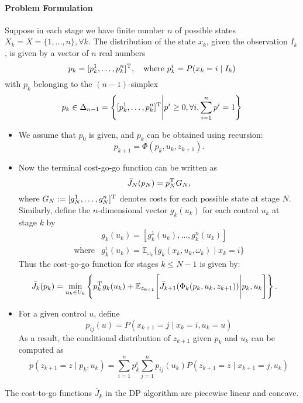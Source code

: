 \paragraph{Problem Formulation}
Suppose in each stage we have finite number $n$ of possible states $X_k=X=\{1,\dots,n\},\forall k$.
The distribution of the state $x_k$, given the observation $I_k$,
is given by a vector of $n$ real numbers 
\[
p_k=[p_k^1,\dots,p_k^n]^{\mathrm T},\quad
\text{where }p_k^i = P(x_k=i\mid I_k)
\]
with $p_k$ belonging to the $(n-1)$-simplex
\[
p_k\in\Delta_{n-1}=\left\{
[p_k^1,\dots,p_k^n]^{\mathrm T}\middle|p^i\ge0,\forall i,
\sum_{i=1}^np^i=1
\right\}
\]
\begin{itemize}
\item
We assume that $p_0$ is given, and $p_k$ can be obtained using recursion:
\[
p_{k+1}=\Phi(p_k,u_k,z_{k+1}).
\]
\item
Now the terminal cost-go-go function can be written as
\[
\bar{J}_N(p_N)=p_N^{\mathrm T} G_N,
\]
where $G_N:=[g_{N}^1,\dots,g_N^n]^{\mathrm T}$ denotes costs for each possible state at stage $N$.
Similarly, define the $n$-dimensional vector $g_k(u_k)$
for each control $u_k$ at stage $k$ by
\[
\begin{array}{ll}
&g_k(u_k)=[g_k^1(u_k),\dots,g_k^n(u_k)]\\
\text{where}&g_k^i(u_k)=\mathbb{E}_{\omega_k}\{g_k(x_k,u_k,\omega_k)\mid x_k=i\}
\end{array}
\]
Thus the cost-go-go function for stages $k\le N-1$ is given by:
\begin{align*}
\bar{J}_k(p_k)&=\min_{u_k\in U_k}
\left\{
p_k^{\mathrm T} g_k(u_k)
+
\mathbb{E}_{z_{k+1}}
\Bigg[
\bar{J}_{k+1}(\Phi_k(p_k,u_k,z_{k+1}))\Bigg| p_k,u_k
\Bigg]
\right\}.
\end{align*}
\item
For a given control $u$, define
\[
p_{ij}(u)=P(x_{k+1}=j\mid x_k=i,u_k=u)
\]
As a result, the conditional distribution of $z_{k+1}$ given $p_k$ and $u_k$ can be computed as
\[
p(z_{k+1}=z\mid p_k,u_k)=\sum_{i=1}^np_k^i\sum_{j=1}^np_{ij}(u_k)P(z_{k+1}=z\mid x_{k+1}=j,u_k)
\]
\end{itemize}

\begin{theorem}
The cost-to-go functions $\bar{J}_k$ in the DP algorithm are piecewise linear and concave.
\end{theorem}

